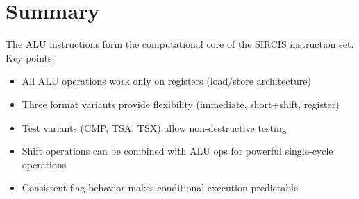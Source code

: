 \section{Summary}

The ALU instructions form the computational core of the SIRCIS instruction set. Key points:

\begin{itemize}
	\item All ALU operations work only on registers (load/store architecture)
	\item Three format variants provide flexibility (immediate, short+shift, register)
	\item Test variants (CMP, TSA, TSX) allow non-destructive testing
	\item Shift operations can be combined with ALU ops for powerful single-cycle operations
	\item Consistent flag behavior makes conditional execution predictable
\end{itemize}

